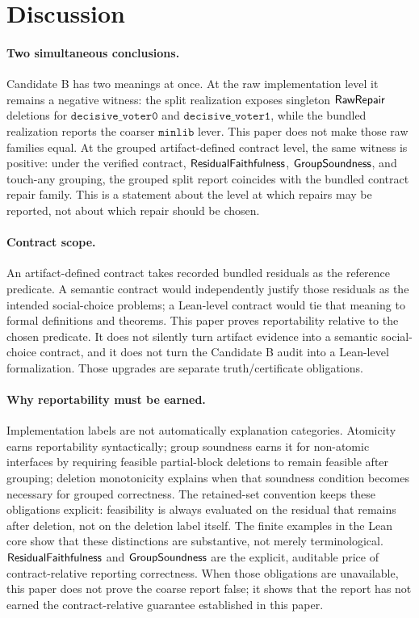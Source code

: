 \section{Discussion}
\label{sec:discussion}

\paragraph{Two simultaneous conclusions.}
Candidate B has two meanings at once.  At the raw implementation level it
remains a negative witness: the split realization exposes singleton
\(\mathsf{RawRepair}\) deletions for \(\mathtt{decisive\_voter0}\) and
\(\mathtt{decisive\_voter1}\), while the bundled realization reports the
coarser \(\mathtt{minlib}\) lever.  This paper does not make those raw families equal.
At the grouped artifact-defined contract level, the same witness is positive:
under the verified contract, \(\mathsf{ResidualFaithfulness}\), \(\mathsf{GroupSoundness}\),
and touch-any grouping, the grouped split report coincides with the bundled
contract repair family.  This is a statement about the level at which repairs
may be reported, not about which repair should be chosen.

\paragraph{Contract scope.}
An artifact-defined contract takes recorded bundled residuals as the reference
predicate.  A semantic contract would independently justify those residuals as
the intended social-choice problems; a Lean-level contract would tie that
meaning to formal definitions and theorems.  This paper proves reportability relative
to the chosen predicate.  It does not silently turn artifact evidence into a
semantic social-choice contract, and it does not turn the Candidate B audit into
a Lean-level formalization.  Those upgrades are separate truth/certificate
obligations.

\paragraph{Why reportability must be earned.}
Implementation labels are not automatically explanation categories.
Atomicity earns reportability syntactically; group soundness earns it for
non-atomic interfaces by requiring feasible partial-block deletions to remain
feasible after grouping; deletion monotonicity explains when that soundness
condition becomes necessary for grouped correctness.  The retained-set
convention keeps these obligations explicit: feasibility is always evaluated on
the residual that remains after deletion, not on the deletion label itself.
The finite examples in the Lean core show that these distinctions are
substantive, not merely terminological.  \(\mathsf{ResidualFaithfulness}\) and
\(\mathsf{GroupSoundness}\) are the explicit, auditable price of contract-relative
reporting correctness.  When those obligations are unavailable, this paper does
not prove the coarse report false; it shows that the report has not earned the
contract-relative guarantee established in this paper.

